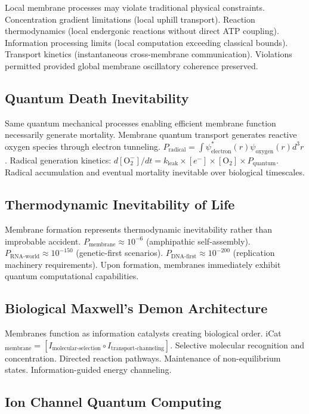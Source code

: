 \documentclass[12pt,a4paper]{article}
\begin{document}
Local membrane processes may violate traditional physical constraints. Concentration gradient limitations (local uphill transport). Reaction thermodynamics (local endergonic reactions without direct ATP coupling). Information processing limits (local computation exceeding classical bounds). Transport kinetics (instantaneous cross-membrane communication). Violations permitted provided global membrane oscillatory coherence preserved.

\subsection{Quantum Death Inevitability}

Same quantum mechanical processes enabling efficient membrane function necessarily generate mortality. Membrane quantum transport generates reactive oxygen species through electron tunneling. $P_{\text{radical}} = \int \psi_{\text{electron}}^*(r) \psi_{\text{oxygen}}(r) d^3r$. Radical generation kinetics: $d[\text{O}_2^-]/dt = k_{\text{leak}} \times [e^-] \times [\text{O}_2] \times P_{\text{quantum}}$. Radical accumulation and eventual mortality inevitable over biological timescales.

\subsection{Thermodynamic Inevitability of Life}

Membrane formation represents thermodynamic inevitability rather than improbable accident. $P_{\text{membrane}} \approx 10^{-6}$ (amphipathic self-assembly). $P_{\text{RNA-world}} \approx 10^{-150}$ (genetic-first scenarios). $P_{\text{DNA-first}} \approx 10^{-200}$ (replication machinery requirements). Upon formation, membranes immediately exhibit quantum computational capabilities.

\subsection{Biological Maxwell's Demon Architecture}

Membranes function as information catalysts creating biological order. iCat$_{\text{membrane}} = [I_{\text{molecular-selection}} \circ I_{\text{transport-channeling}}]$. Selective molecular recognition and concentration. Directed reaction pathways. Maintenance of non-equilibrium states. Information-guided energy channeling.

\subsection{Ion Channel Quantum Computing}
\end{document}
